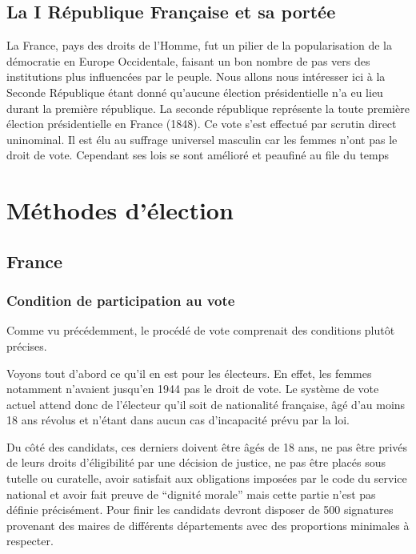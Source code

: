 \documentclass[12pt,a4paper]{report}
\begin{document}
\section{La I République Française et sa portée}
La France, pays des droits de l’Homme, fut un pilier de la popularisation de la démocratie en Europe Occidentale, faisant un bon nombre de pas vers des institutions plus influencées par le peuple.
Nous allons nous intéresser ici à la Seconde République étant donné qu’aucune élection présidentielle n'a eu lieu durant la première république\nocite{wiki:deuxiemerep}.
La seconde république représente la toute première élection présidentielle en France (1848)\nocite{wiki:1848}.
Ce vote s'est effectué par scrutin direct uninominal.
Il est élu au suffrage universel masculin car les femmes n’ont pas le droit de vote. Cependant ses lois se sont amélioré et peaufiné au file du temps \nocite{wiki:premiererep}


\chapter{Méthodes d'élection}
\section{France} %
\subsection{Condition de participation au vote}

Comme vu précédemment, le procédé de vote comprenait des conditions plutôt précises.

Voyons tout d'abord ce qu'il en est pour les électeurs.
En effet, les femmes notamment n’avaient jusqu'en 1944 \nocite{wiki:droitvotefemmes} pas le droit de vote.
Le système de vote actuel attend donc de l'électeur qu’il soit de nationalité française, âgé d'au moins 18 ans révolus et n’étant dans aucun cas d’incapacité prévu par la loi.

Du côté des candidats, ces derniers doivent être âgés de 18 ans, ne pas être privés de leurs droits d’éligibilité par une décision de justice, ne pas être placés sous tutelle ou curatelle, avoir satisfait aux obligations imposées par le code du service national et avoir fait preuve de “dignité morale” mais cette partie n’est pas définie précisément.
Pour finir les candidats devront disposer de 500 signatures provenant des maires de différents départements avec des proportions minimales à respecter.
\end{document}
